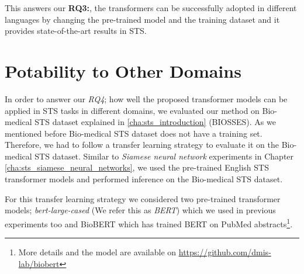 This answers our \textbf{RQ3:}, the transformers can be successfully adopted in different languages by changing the pre-trained model and the training dataset and it provides state-of-the-art results in STS.

\section{Potability to Other Domains}
\label{sec:transformer_domain}
In order to answer our \textit{RQ4}; how well the proposed transformer models can be applied in STS tasks in different domains, we evaluated our method on Bio-medical STS dataset explained in \ref{cha:sts_introduction} (BIOSSES). As we mentioned before Bio-medical STS dataset does not have a training set. Therefore, we had to follow a transfer learning strategy to evaluate it on the Bio-medical STS dataset. Similar to \textit{Siamese neural network} experiments in Chapter \ref{cha:sts_siamese_neural_networks}, we used the pre-trained English STS transformer models and performed inference on the Bio-medical STS dataset. 

For this transfer learning strategy we considered two pre-trained transformer models; \textit{bert-large-cased} \autocite{devlin-etal-2019-bert} (We refer this as \textit{BERT}) which we used in previous experiments too and BioBERT \autocite{10.1093/bioinformatics/btz682} which has trained BERT on PubMed abstracts\footnote{More details and the model are available on \url{https://github.com/dmis-lab/biobert}}.

\begin{table}[htb]
	\centering
	\caption[Results for transfer learning with transformers in BIOSSES dataset]{Results for transfer learning with transformers in BIOSSES dataset. Two considered pre-trained transformer models are textbf{BERT} and \textbf{BioBERT}. We only report the Pearson correlation due to ease of visualisation.}  
	\label{tab:transfer_transformers_biosses}
\end{table}


